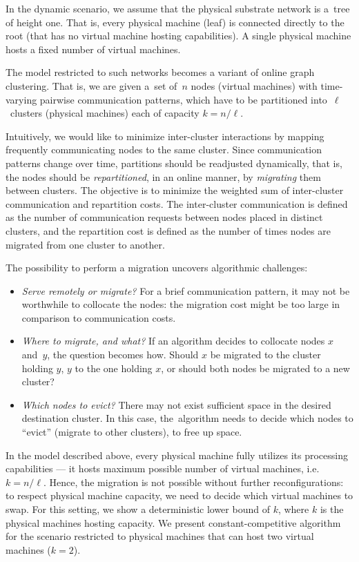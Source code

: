 In the dynamic scenario, we assume that the physical substrate network is a~tree of height one.
That is, every physical machine (leaf) is connected directly to the root (that has no virtual machine hosting capabilities).
A single physical machine hosts a fixed number of virtual machines.

The model restricted to such networks becomes a variant of online graph clustering.
That is, we are given a~set of~$n$ nodes (virtual machines) with time-varying pairwise
communication patterns, which have to be partitioned into~$\ell$~clusters (physical machines) each of
capacity $k=n/\ell$.

Intuitively, we would like to minimize inter-cluster
interactions by mapping frequently communicating nodes to the same cluster.
Since communication patterns change over time, partitions should be
readjusted dynamically, that is, the nodes should be \emph{repartitioned}, in
an online manner, by \emph{migrating} them between clusters.
The objective is to minimize the weighted sum of inter-cluster communication and repartition costs.
The inter-cluster communication is defined as the number of communication requests between nodes placed in distinct clusters, and the repartition cost is defined as the number of times nodes are migrated from one cluster to
another.


The possibility to perform a migration uncovers algorithmic challenges:
\begin{itemize}

\item \emph{Serve remotely or migrate?} For a brief communication
pattern, it may not be worthwhile to collocate the nodes: the migration cost might
be too large in comparison to communication costs.

\item \emph{Where to migrate, and what?}
If an algorithm decides to collocate nodes $x$ and~$y$, the question becomes
how. Should $x$ be migrated to the cluster holding $y$, $y$ to the one holding
$x$, or should both nodes be migrated to a new cluster?

\item \emph{Which nodes to evict?}
There may not exist sufficient space in the desired destination cluster. In
this case, the~algorithm needs to decide which nodes to ``evict'' (migrate to
other clusters), to free up space.

\end{itemize}

In the model described above, every physical machine fully utilizes its processing capabilities --- it hosts maximum possible number of virtual machines, i.e. $k=n/\ell$.
Hence, the migration is not possible without further reconfigurations: to respect physical machine capacity, we need to decide which virtual machines to swap.
For this setting, we show a deterministic lower bound of $k$, where $k$ is the physical machines hosting capacity.
We present constant-competitive algorithm for the scenario restricted to physical machines that can host two virtual machines ($k = 2$).

